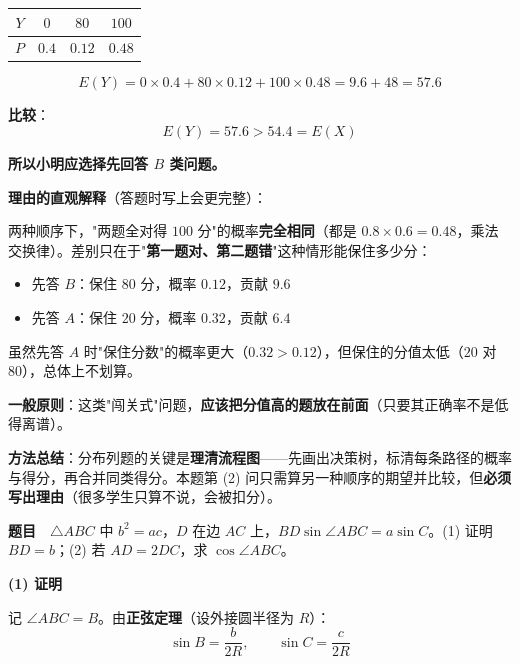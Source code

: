 \begin{center}
\begin{tabular}{cccc}
\toprule
$Y$ & $0$ & $80$ & $100$ \\
\midrule
$P$ & $0.4$ & $0.12$ & $0.48$ \\
\bottomrule
\end{tabular}
\end{center}

\[E(Y)=0\times0.4+80\times0.12+100\times0.48=9.6+48=57.6\]

\textbf{比较}：
\[E(Y)=57.6>54.4=E(X)\]

\textbf{所以小明应选择先回答 $B$ 类问题。}

\par\medskip

\textbf{理由的直观解释}（答题时写上会更完整）：

两种顺序下，"两题全对得 $100$ 分"的概率\textbf{完全相同}（都是 $0.8\times0.6=0.48$，乘法交换律）。差别只在于"\textbf{第一题对、第二题错}"这种情形能保住多少分：

\begin{itemize}
\item 先答 $B$：保住 $80$ 分，概率 $0.12$，贡献 $9.6$
\item 先答 $A$：保住 $20$ 分，概率 $0.32$，贡献 $6.4$
\end{itemize}

虽然先答 $A$ 时"保住分数"的概率更大（$0.32>0.12$），但保住的分值太低（$20$ 对 $80$），总体上不划算。

\textbf{一般原则}：这类"闯关式"问题，\textbf{应该把分值高的题放在前面}（只要其正确率不是低得离谱）。

\begin{gktip}
\textbf{方法总结}：分布列题的关键是\textbf{理清流程图}——先画出决策树，标清每条路径的概率与得分，再合并同类得分。本题第 (2) 问只需算另一种顺序的期望并比较，但\textbf{必须写出理由}（很多学生只算不说，会被扣分）。
\end{gktip}

\par\medskip


\textbf{题目}　$\triangle ABC$ 中 $b^{2}=ac$，$D$ 在边 $AC$ 上，$BD\sin\angle ABC=a\sin C$。(1) 证明 $BD=b$；(2) 若 $AD=2DC$，求 $\cos\angle ABC$。

\par\medskip

\textbf{(1) 证明}

记 $\angle ABC=B$。由\textbf{正弦定理}（设外接圆半径为 $R$）：
\[\sin B=\frac b{2R},\qquad \sin C=\frac c{2R}\]

